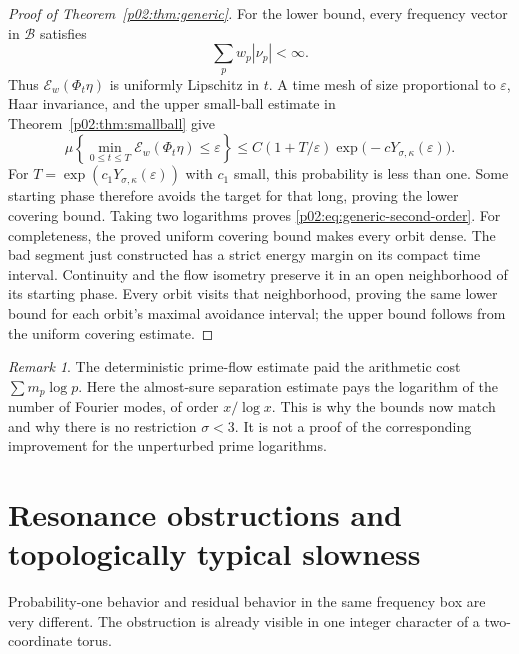 \documentclass[11pt,letterpaper]{article}
\theoremstyle{definition}
\theoremstyle{remark}
\newtheorem{remark}[theorem]{Remark}
\newcommand{\eps}{\varepsilon}
\newcommand{\1}{\mathbf 1}
\begin{document}
\begin{proof}[Proof of Theorem~\ref{p02:thm:generic}]
For the lower bound, every frequency vector in $\mathcal B$ satisfies
\[
 \sum_p w_p|\nu_p|<\infty.
\]
Thus $\mathcal E_w(\Phi_t\eta)$ is uniformly Lipschitz in $t$. A time mesh of
size proportional to $\eps$, Haar invariance, and the upper
small-ball estimate in Theorem~\ref{p02:thm:smallball} give
\[
 \mu\left\{\min_{0\le t\le T}\mathcal E_w(\Phi_t\eta)\le\eps\right\}
 \le C(1+T/\eps)\exp\bigl(-cY_{\sigma,\kappa}(\eps)\bigr).
\]
For $T=\exp(c_1Y_{\sigma,\kappa}(\eps))$ with $c_1$ small, this
probability is less than one. Some starting phase therefore avoids
the target for that long, proving the lower covering bound. Taking
two logarithms proves \eqref{p02:eq:generic-second-order}.
For completeness, the proved uniform covering bound makes every
orbit dense. The bad
segment just constructed has a strict energy margin on its compact
time interval. Continuity and the flow isometry preserve it in an
open neighborhood of its starting phase. Every orbit visits that
neighborhood, proving the same lower bound for each orbit's maximal
avoidance interval; the upper bound follows from the uniform covering
estimate.
\end{proof}

\begin{remark}
The deterministic prime-flow estimate paid the arithmetic cost
$\sum m_p\log p$. Here the almost-sure separation estimate pays
the logarithm of the number of Fourier modes, of order $x/\log x$.
This is why the bounds now match and why there is no restriction
$\sigma<3$. It is not a proof of the corresponding improvement for
the unperturbed prime logarithms.
\end{remark}

\section{Resonance obstructions and topologically typical slowness}
\label{p02:sec:residual}

Probability-one behavior and residual behavior in the same frequency
box are very different. The obstruction is already visible in one
integer character of a two-coordinate torus.
\end{document}
